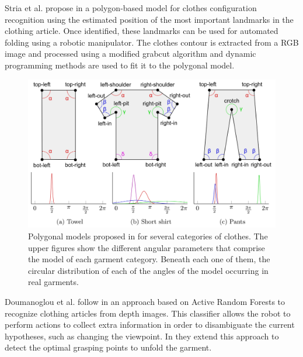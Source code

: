 Stria et al. propose in \cite{Stria2014, Stria2014IROS} a polygon-based model for clothes configuration recognition using the estimated position of the most important landmarks in the clothing article. Once identified, these landmarks can be used for automated folding using a robotic manipulator. The clothes contour is extracted from a RGB image and processed using a modified grabcut algorithm and dynamic programming methods are used to fit it to the polygonal model.

\begin{figure}[thpb]
    \centering
    \includegraphics[width=\textwidth]{figures/SOTA_Stria_2014-3.png}
    \caption[Polygonal models proposed by Stria et al.]
    {Polygonal models proposed in \cite{Stria2014} for several categories of clothes. The upper figures show the different angular parameters that comprise the model of each garment category. Beneath each one of them, the circular distribution of each of the angles of the model occurring in real garments.}
    \label{fig:SOTA_Stria_2014}
\end{figure}


Doumanoglou et al. follow in \cite{Doumanoglou2014ECCV} an approach based on Active Random Forests to recognize clothing articles from depth images. This classifier allows the robot to perform actions to collect extra information in order to disambiguate the current hypotheses, such as changing the viewpoint. In \cite{Doumanoglou2014ICRA} they extend this approach to detect the optimal grasping points to unfold the garment.


